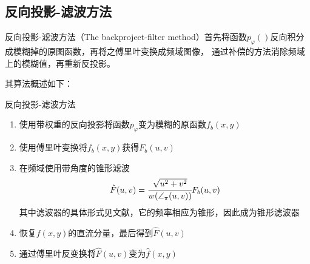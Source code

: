 \subsection{反向投影-滤波方法}
反向投影-滤波方法（The backproject-filter method）首先将函数$p_\varphi()$反向积分成模糊掉的原图函数，再将之傅里叶变换成频域图像，
通过补偿的方法消除频域上的模糊值，再重新反投影\cite{smith1973image}。

其算法概述如下：
\begin{algo}
反向投影-滤波方法
\begin{enumerate}
\item 使用带权重的反向投影将函数$p_\varphi$变为模糊的原函数$f_b(x,y)$
\item 使用傅里叶变换将$f_b(x,y)$获得$F_b(u,v)$
\item 在频域使用带角度的锥形滤波
\begin{equation*}
\hat{F}(u,v)=\cfrac{\sqrt{u^2+v^2}}{w(\angle_\pi(u,v))}F_b(u,v)
\end{equation*}
其中滤波器的具体形式见文献\cite{smith1973image}，它的频率相应为锥形，因此成为锥形滤波器
\item 恢复$f(x,y)$的直流分量，最后得到$\hat{F}(u,v)$
\item 通过傅里叶反变换将$\hat{F}(u,v)$变为$\hat{f}(x,y)$
\end{enumerate}
\end{algo}

